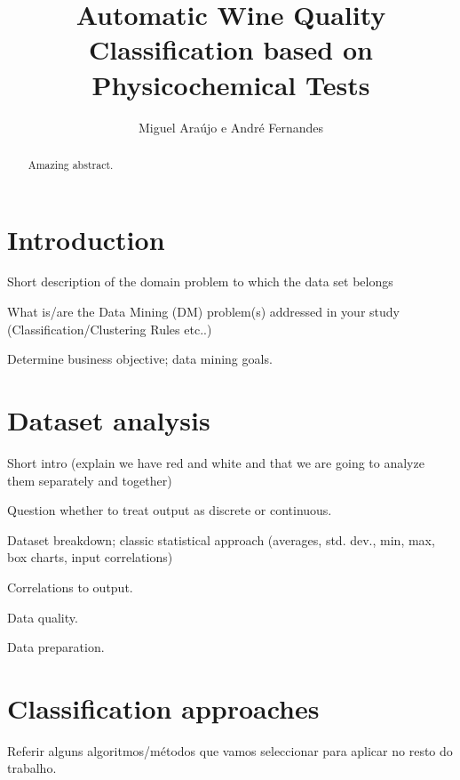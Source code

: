 \documentclass{llncs}
\begin{document}
%
\pagestyle{headings}  %
%
%
\title{Automatic Wine Quality Classification based on Physicochemical Tests }

\author{Miguel Araújo e André Fernandes}


\maketitle

\begin{abstract}
Amazing abstract.

\end{abstract}

\section{Introduction}
 Short description of the domain problem to which the data set belongs

What is/are the Data Mining (DM) problem(s) addressed in your study  (Classification/Clustering Rules etc..)

Determine business objective; data mining goals.

\section{Dataset analysis}
Short intro (explain we have red and white and that we are going to analyze them separately and together)

Question whether to treat output as discrete or continuous.

Dataset breakdown; classic statistical approach (averages, std. dev., min, max, box charts, input correlations)

Correlations to output.

Data quality.

Data preparation.

\section{Classification approaches}
Referir alguns algoritmos/métodos que vamos seleccionar para aplicar no resto do trabalho.
\end{document}
